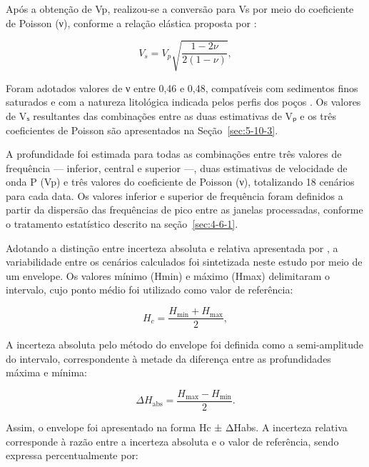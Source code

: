 Após a obtenção de Vp, realizou-se a conversão para Vs por meio do coeficiente de Poisson (ν), conforme a relação elástica proposta por :

\begin{equation}
  V_s=V_p\sqrt{\frac{1-2\nu}{2(1-\nu)}},
  \label{eq:vp-vs}
\end{equation}

\noindent
Foram adotados valores de ν entre 0,46 e 0,48, compatíveis com sedimentos finos saturados e com a natureza litológica indicada pelos perfis dos poços \cite{davidovici1985,domenico1990,prakash1990}. Os valores de Vₛ resultantes das combinações entre as duas estimativas de Vₚ e os três coeficientes de Poisson são apresentados na Seção~\ref{sec:5-10-3}.

A profundidade foi estimada para todas as combinações entre três valores de frequência — inferior, central e superior —, duas estimativas de velocidade de onda P (Vp) e três valores do coeficiente de Poisson (ν), totalizando 18 cenários para cada data. Os valores inferior e superior de frequência foram definidos a partir da dispersão das frequências de pico entre as janelas processadas, conforme o tratamento estatístico descrito na seção~\ref{sec:4-6-1}.

Adotando a distinção entre incerteza absoluta e relativa apresentada por , a variabilidade entre os cenários calculados foi sintetizada neste estudo por meio de um envelope. Os valores mínimo (Hmin) e máximo (Hmax) delimitaram o intervalo, cujo ponto médio foi utilizado como valor de referência:

\begin{equation}
  H_c=\frac{H_{\min}+H_{\max}}{2},
  \label{eq:ponto-medio-envelope}
\end{equation}

\noindent
A incerteza absoluta pelo método do envelope foi definida como a semi-amplitude do intervalo, correspondente à metade da diferença entre as profundidades máxima e mínima:

\begin{equation}
  \Delta H_{\mathrm{abs}}=\frac{H_{\max}-H_{\min}}{2}.
  \label{eq:semi-amplitude-envelope}
\end{equation}

Assim, o envelope foi apresentado na forma Hc ± ΔHabs. A incerteza relativa corresponde à razão entre a incerteza absoluta e o valor de referência, sendo expressa percentualmente por:

